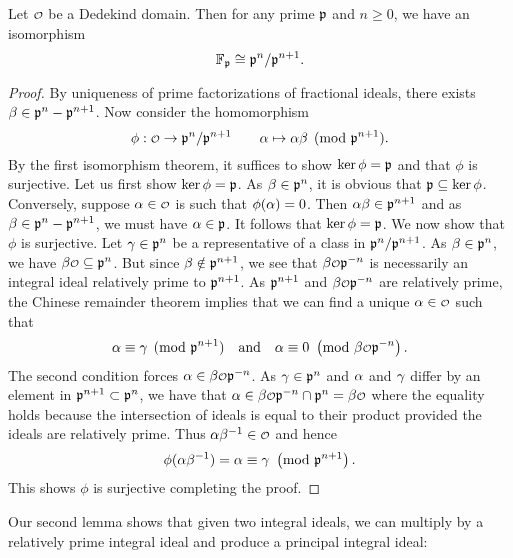     \begin{lemma}\label{lem:isomorphism_of_quotient_by_prime_integral_ideals}
      Let $\smc{O}$ be a Dedekind domain. Then for any prime $\mathfrak{p}$ and $n \ge 0$, we have an isomorphism
      \[
        \mathbb{F}_{\mathfrak{p}} \cong \mathfrak{p}^{n}/\mathfrak{p}^{n+1}.
      \]
    \end{lemma}
    \begin{proof}
      By uniqueness of prime factorizations of fractional ideals, there exists $\beta \in \mathfrak{p}^{n}-\mathfrak{p}^{n+1}$. Now consider the homomorphism
      \[
        \phi:\smc{O} \to \mf{p}^{n}/\mf{p}^{n+1} \qquad \a \mapsto \a\b \pmod{\mf{p}^{n+1}}.
      \]
      By the first isomorphism theorem, it suffices to show $\ker\phi = \mathfrak{p}$ and that $\phi$ is surjective. Let us first show $\ker\phi = \mathfrak{p}$. As $\beta \in \mathfrak{p}^{n}$, it is obvious that $\mathfrak{p} \subseteq \ker\phi$. Conversely, suppose $\a \in \smc{O}$ is such that $\phi(\alpha) = 0$. Then $\alpha\beta \in \mathfrak{p}^{n+1}$ and as $\beta \in \mathfrak{p}^{n}-\mathfrak{p}^{n+1}$, we must have $\alpha \in \mathfrak{p}$. It follows that $\ker\phi = \mathfrak{p}$. We now show that $\phi$ is surjective. Let $\gamma \in \mathfrak{p}^{n}$ be a representative of a class in $\mathfrak{p}^{n}/\mathfrak{p}^{n+1}$. As $\beta \in \mathfrak{p}^{n}$, we have $\b\smc{O} \subseteq \mf{p}^{n}$. But since $\beta \notin \mathfrak{p}^{n+1}$, we see that $\b\smc{O}\mf{p}^{-n}$ is necessarily an integral ideal relatively prime to $\mathfrak{p}^{n+1}$. As $\mathfrak{p}^{n+1}$ and $\b\smc{O}\mf{p}^{-n}$ are relatively prime, the Chinese remainder theorem implies that we can find a unique $\a \in \smc{O}$ such that
      \[
        \a \equiv \g \pmod{\mf{p}^{n+1}} \quad \text{and} \quad \a \equiv 0 \tmod{\b\smc{O}\mf{p}^{-n}}.
      \]
      The second condition forces $\a \in \b\smc{O}\mf{p}^{-n}$. As $\gamma \in \mathfrak{p}^{n}$ and $\alpha$ and $\gamma$ differ by an element in $\mathfrak{p}^{n+1} \subset \mathfrak{p}^{n}$, we have that $\a \in \b\smc{O}\mf{p}^{-n} \cap \mf{p}^{n} = \b\smc{O}$ where the equality holds because the intersection of ideals is equal to their product provided the ideals are relatively prime. Thus $\a\b^{-1} \in \smc{O}$ and hence
      \[
        \phi(\alpha\beta^{-1}) = \alpha \equiv \gamma \ \left(\text{mod }\mathfrak{p}^{n+1}\right).
      \]
      This shows $\phi$ is surjective completing the proof.
    \end{proof}

    Our second lemma shows that given two integral ideals, we can multiply by a relatively prime integral ideal and produce a principal integral ideal:

